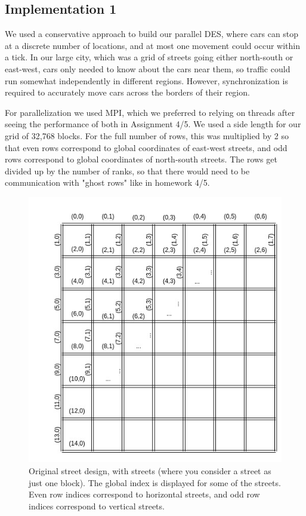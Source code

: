 \documentclass[10pt,a4paper]{article}
\begin{document}
\subsection{Implementation 1}

We used a conservative approach to build our parallel DES, where cars can stop at a discrete number of locations, and at most one movement could occur within a tick. In our large city, which was a grid of streets going either north-south or east-west, cars only needed to know about the cars near them, so traffic could run somewhat independently in different regions. However, synchronization is required to accurately move cars across the borders of their region.

For parallelization we used MPI, which we preferred to relying on threads after seeing the performance of both in Assignment 4/5. We used a side length for our grid of 32,768 blocks. For the full number of rows, this was multiplied by 2 so that even rows correspond to global coordinates of east-west streets, and odd rows correspond to global coordinates of north-south streets. The rows get divided up by the number of ranks, so that there would need to be communication with "ghost rows" like in homework 4/5.

\begin{figure}
    \centering
    \includegraphics[scale=0.4]{parallel.jpg}
    \caption{Original street design, with  streets (where you consider a street as just one block). The global index is displayed for some of the streets. Even row indices correspond to horizontal streets, and odd row indices correspond to vertical streets.}
    \label{fig:my_label}
\end{figure}
\end{document}
